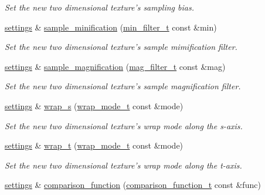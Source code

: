 \begin{DoxyCompactItemize}
\begin{DoxyCompactList}\small\item\em Set the new two dimensional texture's sampling bias. \end{DoxyCompactList}\item 
\hyperlink{classgfx_1_1texture__2D_1_1settings}{settings} \& \hyperlink{classgfx_1_1texture__2D_1_1settings_ab96b99b2ff567b768866f539599791c2}{sample\-\_\-minification} (\hyperlink{classgfx_1_1min__filter__t}{min\-\_\-filter\-\_\-t} const \&min)
\begin{DoxyCompactList}\small\item\em Set the new two dimensional texture's sample mimification filter. \end{DoxyCompactList}\item 
\hyperlink{classgfx_1_1texture__2D_1_1settings}{settings} \& \hyperlink{classgfx_1_1texture__2D_1_1settings_a2beef96fcc1fc2bae60f4d08f98f6bb9}{sample\-\_\-magnification} (\hyperlink{classgfx_1_1mag__filter__t}{mag\-\_\-filter\-\_\-t} const \&mag)
\begin{DoxyCompactList}\small\item\em Set the new two dimensional texture's sample magnification filter. \end{DoxyCompactList}\item 
\hyperlink{classgfx_1_1texture__2D_1_1settings}{settings} \& \hyperlink{classgfx_1_1texture__2D_1_1settings_a6f795168695694e2333014384c06837f}{wrap\-\_\-s} (\hyperlink{classgfx_1_1wrap__mode__t}{wrap\-\_\-mode\-\_\-t} const \&mode)
\begin{DoxyCompactList}\small\item\em Set the new two dimensional texture's wrap mode along the s-\/axis. \end{DoxyCompactList}\item 
\hyperlink{classgfx_1_1texture__2D_1_1settings}{settings} \& \hyperlink{classgfx_1_1texture__2D_1_1settings_ab90d2abb4628a81c44beb6c2b15cc2a8}{wrap\-\_\-t} (\hyperlink{classgfx_1_1wrap__mode__t}{wrap\-\_\-mode\-\_\-t} const \&mode)
\begin{DoxyCompactList}\small\item\em Set the new two dimensional texture's wrap mode along the t-\/axis. \end{DoxyCompactList}\item 
\hyperlink{classgfx_1_1texture__2D_1_1settings}{settings} \& \hyperlink{classgfx_1_1texture__2D_1_1settings_a46920869d5fdf2822fafe95b400c1664}{comparison\-\_\-function} (\hyperlink{classgfx_1_1comparison__function__t}{comparison\-\_\-function\-\_\-t} const \&func)

\end{DoxyCompactItemize}
